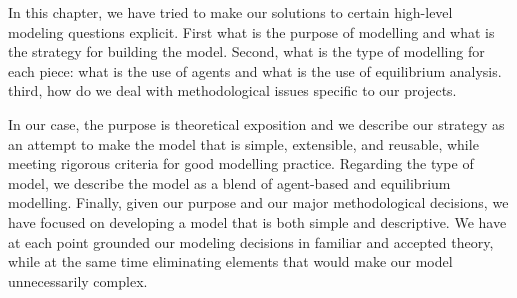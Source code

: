 In this chapter, we have tried to make our solutions to certain high-level modeling questions explicit. First what is the purpose of modelling and what is the strategy for building the model. Second, what is the type of modelling for each piece: what is the use of agents and what is the use of equilibrium analysis. 
third, how do we deal with methodological issues specific to our projects. 

In our case, the purpose is theoretical exposition and we describe our strategy as an attempt to make the model that is simple, extensible, and reusable, while meeting rigorous criteria for good modelling practice. Regarding the type of model, we describe the model as a blend of agent-based and equilibrium modelling.
Finally, given our purpose and our major methodological decisions, we have focused on developing a model that is both simple and descriptive. We have at each point grounded our modeling decisions in familiar and accepted theory, while at the same time eliminating elements that would make our model unnecessarily complex. 
